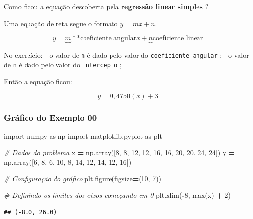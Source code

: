\documentclass[
]{book}
\newenvironment{Shaded}{\begin{snugshade}}{\end{snugshade}}
\newcommand{\BuiltInTok}[1]{#1}
\newcommand{\CommentTok}[1]{\textcolor[rgb]{0.56,0.35,0.01}{\textit{#1}}}
\newcommand{\DecValTok}[1]{\textcolor[rgb]{0.00,0.00,0.81}{#1}}
\newcommand{\ImportTok}[1]{#1}
\newcommand{\NormalTok}[1]{#1}
\newcommand{\OperatorTok}[1]{\textcolor[rgb]{0.81,0.36,0.00}{\textbf{#1}}}
\begin{document}
Como ficou a equação descoberta pela \textbf{regressão linear simples} ?

Uma equação de reta segue o formato \(y = mx + n\).

\[
y = \underbrace{m}*{*\text{coeficiente angular}} x + \underbrace{n}{\text{coeficiente linear}}
\]

No exercício: - o valor de \texttt{m} é dado pelo valor do
\texttt{coeficiente\ angular} ; - o valor de \texttt{n} é dado pelo valor do
\texttt{intercepto} ;

Então a equação ficou:

\[
y = 0,4750(x) + 3
\]

\subsubsection{Gráfico do Exemplo 00}\label{gruxe1fico-do-exemplo-00}

\begin{Shaded}
\begin{Highlighting}[]
\ImportTok{import}\NormalTok{ numpy }\ImportTok{as}\NormalTok{ np}
\ImportTok{import}\NormalTok{ matplotlib.pyplot }\ImportTok{as}\NormalTok{ plt}

\CommentTok{\# Dados do problema}
\NormalTok{x }\OperatorTok{=}\NormalTok{ np.array([}\DecValTok{8}\NormalTok{, }\DecValTok{8}\NormalTok{, }\DecValTok{12}\NormalTok{, }\DecValTok{12}\NormalTok{, }\DecValTok{16}\NormalTok{, }\DecValTok{16}\NormalTok{, }\DecValTok{20}\NormalTok{, }\DecValTok{20}\NormalTok{, }\DecValTok{24}\NormalTok{, }\DecValTok{24}\NormalTok{])}
\NormalTok{y }\OperatorTok{=}\NormalTok{ np.array([}\DecValTok{6}\NormalTok{, }\DecValTok{8}\NormalTok{, }\DecValTok{6}\NormalTok{, }\DecValTok{10}\NormalTok{, }\DecValTok{8}\NormalTok{, }\DecValTok{14}\NormalTok{, }\DecValTok{12}\NormalTok{, }\DecValTok{14}\NormalTok{, }\DecValTok{12}\NormalTok{, }\DecValTok{16}\NormalTok{])}

\CommentTok{\# Configuração do gráfico}
\NormalTok{plt.figure(figsize}\OperatorTok{=}\NormalTok{(}\DecValTok{10}\NormalTok{, }\DecValTok{7}\NormalTok{))}

\CommentTok{\# Definindo os limites dos eixos começando em 0}
\NormalTok{plt.xlim(}\OperatorTok{{-}}\DecValTok{8}\NormalTok{, }\BuiltInTok{max}\NormalTok{(x) }\OperatorTok{+} \DecValTok{2}\NormalTok{)}
\end{Highlighting}
\end{Shaded}

\begin{verbatim}
## (-8.0, 26.0)
\end{verbatim}
\end{document}
